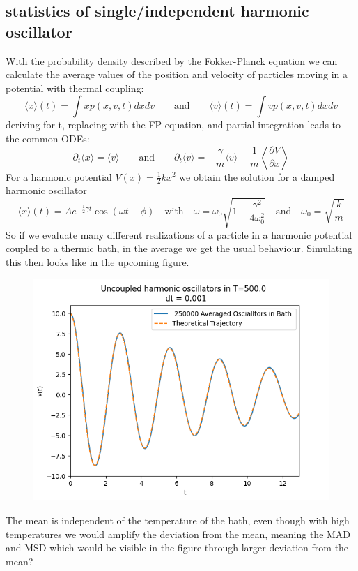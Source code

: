	\subsection{statistics of single/independent harmonic oscillator}
	With the probability density described by the Fokker-Planck equation we can calculate the average values of the position and velocity of particles moving in a potential with thermal coupling:
	\begin{equation}
		\langle x \rangle (t) =	\int x p(x, v, t) dx dv \qquad \text{and} \qquad \langle v \rangle (t) =	\int v p(x, v, t) dx dv
	\end{equation}
	deriving for t, replacing with the FP equation, and partial integration leads to the common ODEs:
	\begin{equation}
		\partial_t \langle x \rangle = \langle v \rangle \qquad \text{and} \qquad \partial_t \langle v \rangle = - \frac{\gamma}{m} \langle v \rangle - \frac{1}{m} \left\langle \frac{\partial V}{\partial x} \right\rangle
	\end{equation}
	For a harmonic potential $V(x) =\frac{1}{2} k x^2$ we obtain the solution for a damped harmonic oscillator
	\begin{equation}
		\langle x \rangle (t) =	A e^{-\frac{1}{2}\gamma t} \cos\left(\omega t - \phi \right) \quad \text{with} \quad \omega =	\omega_0 \sqrt{1 - \frac{\gamma^2}{4  \omega_0^2}} \quad \text{and} \quad \omega_0 = \sqrt{\frac{k}{m}}
	\end{equation}
	So if we evaluate many different realizations of a particle in a harmonic potential coupled to a thermic bath, in the average we get the usual behaviour. Simulating this then looks like in the upcoming figure.
	\begin{figure}[htp]
		\centering
		\includegraphics[width =12cm]{graphics/convharmonicmean.png}
	\end{figure}
	The mean is independent of the temperature of the bath, even though with high temperatures we would amplify the deviation from the mean, meaning the MAD and MSD which would be visible in the figure through larger deviation from the mean?
	
